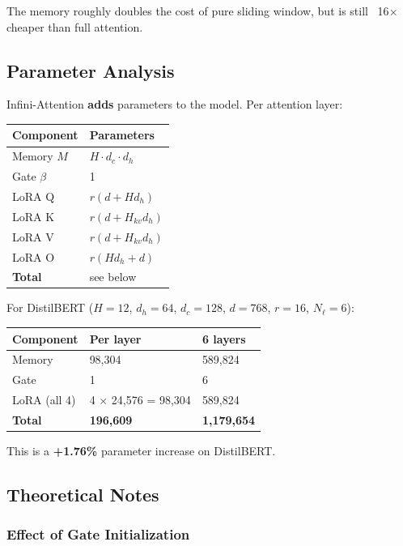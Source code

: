 The memory roughly doubles the cost of pure sliding window, but is still 
~16$\times$ cheaper than full attention.

\subsection{Parameter Analysis}

Infini-Attention \textbf{adds} parameters to the model. Per attention layer:

\begin{table}[H]
\centering
\small
\begin{tabular}{ll}
\toprule
\textbf{Component} & \textbf{Parameters} \\
\midrule
Memory $M$ & $H \cdot d_c \cdot d_h$ \\
Gate $\beta$ & 1 \\
LoRA Q & $r(d + H d_h)$ \\
LoRA K & $r(d + H_{kv} d_h)$ \\
LoRA V & $r(d + H_{kv} d_h)$ \\
LoRA O & $r(H d_h + d)$ \\
\textbf{Total} & see below \\
\bottomrule
\end{tabular}
\end{table}

For DistilBERT ($H = 12$, $d_h = 64$, $d_c = 128$, $d = 768$, $r = 16$, 
$N_\ell = 6$):

\begin{table}[H]
\centering
\small
\begin{tabular}{lll}
\toprule
\textbf{Component} & \textbf{Per layer} & \textbf{6 layers} \\
\midrule
Memory & 98,304 & 589,824 \\
Gate & 1 & 6 \\
LoRA (all 4) & 4 $\times$ 24,576 = 98,304 & 589,824 \\
\textbf{Total} & \textbf{196,609} & \textbf{1,179,654} \\
\bottomrule
\end{tabular}
\end{table}

This is a \textbf{+1.76\%} parameter increase on DistilBERT.

\subsection{Theoretical Notes}

\subsubsection{Effect of Gate Initialization}

